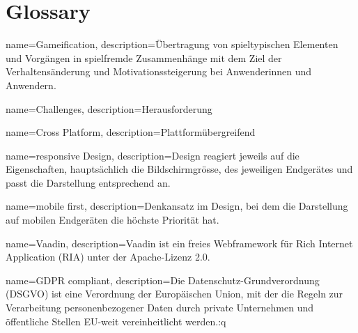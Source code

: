 \chapter{Glossary}

{
    name=Gameification,
    description={\"{U}bertragung von spieltypischen Elementen und Vorg\"{a}ngen in spielfremde Zusammenh\"{a}nge mit dem Ziel der Verhaltens\"{a}nderung und Motivationssteigerung bei Anwenderinnen und Anwendern.}
}


{
    name=Challenges,
    description={Herausforderung}
}


{
    name=Cross Platform,
    description={Plattform\"{u}bergreifend}
}


{
    name=responsive Design,
    description={Design reagiert jeweils auf die Eigenschaften, haupts\"{a}chlich die Bildschirmgr\"{o}sse, des jeweiligen Endger\"{a}tes und passt die Darstellung entsprechend an.}
}


{
    name=mobile first,
    description={Denkansatz im Design, bei dem die Darstellung auf mobilen Endger\"{a}ten die h\"{o}chste Priorit\"{a}t hat.}
}


{
    name=Vaadin,
    description={Vaadin ist ein freies Webframework f\"{u}r Rich Internet Application (RIA) unter der Apache-Lizenz 2.0.}
}


{
    name=GDPR compliant,
    description={Die Datenschutz-Grundverordnung (DSGVO) ist eine Verordnung der Europ\"{a}ischen Union, mit der die Regeln zur Verarbeitung personenbezogener Daten durch private Unternehmen und \"{o}ffentliche Stellen EU-weit vereinheitlicht werden.:q}
}


\printglossaries
